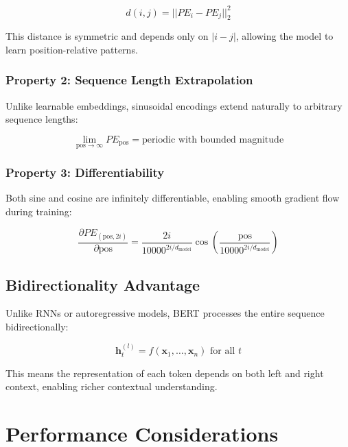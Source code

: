 \documentclass[11pt,a4paper]{article}
\begin{document}
\begin{equation}
d(i,j) = ||PE_i - PE_j||_2^2
\end{equation}

This distance is symmetric and depends only on $|i - j|$, allowing the model to learn position-relative patterns.

\subsubsection{Property 2: Sequence Length Extrapolation}

Unlike learnable embeddings, sinusoidal encodings extend naturally to arbitrary sequence lengths:

\begin{equation}
\lim_{\text{pos} \to \infty} PE_{\text{pos}} = \text{periodic with bounded magnitude}
\end{equation}

\subsubsection{Property 3: Differentiability}

Both sine and cosine are infinitely differentiable, enabling smooth gradient flow during training:

\begin{equation}
\frac{\partial PE_{(\text{pos}, 2i)}}{\partial \text{pos}} = \frac{2i}{10000^{2i/d_{\text{model}}}} \cos\left(\frac{\text{pos}}{10000^{2i/d_{\text{model}}}}\right)
\end{equation}

\subsection{Bidirectionality Advantage}

Unlike RNNs or autoregressive models, BERT processes the entire sequence bidirectionally:

\begin{equation}
\mathbf{h}_t^{(l)} = f(\mathbf{x}_1, \ldots, \mathbf{x}_n) \text{ for all } t
\end{equation}

This means the representation of each token depends on both left and right context, enabling richer contextual understanding.

\section{Performance Considerations}
\end{document}
